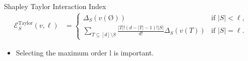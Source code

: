 \documentclass[10pt]{beamer}
\newcommand{\f}{v}
\newcommand{\ex}{\Expl}
\def\Expl{\mathcal{E}}
\begin{document}
\begin{frame}
    \begin{mydefbox}{Shapley Taylor Interaction Index}
        {\small
        \begin{align*}
            \ex_S^{\text{Taylor}}(\f,\ell) &= 
            \begin{cases}
                \Delta_S(\f(\text{\O})) & \text{if } |S| < \ell, \\
                \sum_{T \subseteq [d] \setminus S} \frac{|T|!(d-|T|-1)!|S|}{d!} \Delta_S(\f(T)) & \text{if } |S| = \ell.
            \end{cases}
            \tag{7}
        \end{align*}
        }
    \end{mydefbox}
    \vspace{1.5em}
    \begin{itemize}[label=\scalebox{0.5}{$\blacksquare$}]
        \item Selecting the maximum order l is important.
    \end{itemize}
\end{frame}
\end{document}
